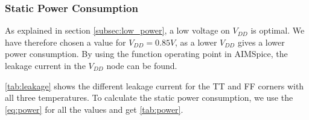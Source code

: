 \subsubsection{Static Power Consumption}

As explained in section \ref{subsec:low_power}, a low voltage on $V_{DD}$ is optimal. We have therefore chosen a value for $V_{DD} = 0.85V$, as a lower $V_{DD}$ gives a lower power consumption. By using the function operating point in AIMSpice, the leakage current in the $V_{DD}$ node can be found.

 \autoref{tab:leakage} shows the different leakage current for the TT and FF corners with all three temperatures. To calculate the static power consumption, we use the \autoref{eq:power} for all the values and get  \autoref{tab:power}.

\begin{table}[H]
\centering
\caption{Leakage Current.}
\label{tab:leakage}
\end{table}

\begin{table}[H]
\centering
\caption{Static Power Consumption.}
\label{tab:power}
\end{table}

